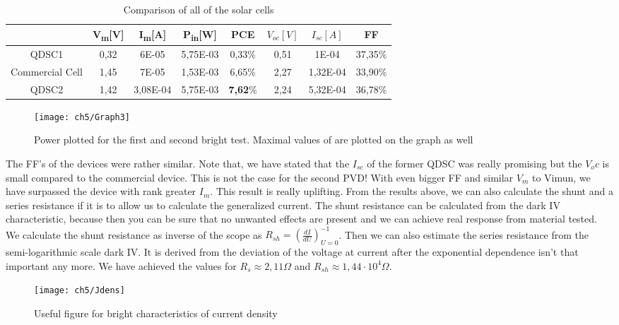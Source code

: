 \begin{table}[b]
\centering
\begin{tabular}{|c |c |c | c | c| c | c | c |}
\hline
& V\textsubscript{m}{[}V{]} & I\textsubscript{m}{[}A{]} &P\textsubscript{in}{[}W{]} & PCE & $V_{oc}[V]$ & $I_{sc}[A]$ & FF\\
\hline
QDSC1 & 0,32 & 6E-05 & 5,75E-03 & 0,33$\%$ & 0,51&1E-04&37,35$\%$\\
\hline
Commercial Cell & 1,45 & 7E-05 & 1,53E-03 & 6,65$\%$ & 2,27 & 1,32E-04 &33,90$\%$\\
\hline
QDSC2 & 1,42 & 3,08E-04 & 5,75E-03 & \textbf{7,62$\%$} & 2,24 & 5,32E-04 &36,78$\%$\\
\hline

\end{tabular}
\caption{Comparison of all of the solar cells}
\end{table}

\begin{figure}[H]
\centering
\texttt{[image: ch5/Graph3]}
\caption{Power plotted for the first and second bright test. Maximal values of are plotted on the graph as well}
\label{fig:power}
\end{figure}

The FF's of the devices were rather similar. Note that, we have stated that the $I_{sc}$ of the former QDSC was really promising but the $V_oc$ is small compared to the commercial device. This is not the case for the second PVD! With even bigger FF and similar $V_{m}$ to Vimun, we have surpassed the device with rank greater $I_m$. This result is really uplifting. From the results above, we can also calculate the shunt and a series resistance if it is to allow us to calculate the generalized current. The shunt resistance can be calculated from the dark IV characteristic, because then you can be sure that no unwanted effects are present and we can achieve real response from material tested. We calculate the shunt resistance as inverse of the scope as $R_{sh}=\left( \frac{dI}{dU}\right) ^{-1}_{U=0}$. Then we can also estimate the series resistance from the semi-logarithmic scale dark IV. It is derived from the deviation of the voltage at current after the exponential dependence isn't that important any more. We have achieved the values for $R_s \approx 2,11 \Omega$ and $R_{sh} \approx 1,44\cdot 10^{4}\Omega$. \cite{Zekry1996}

\begin{figure}[ht]
\centering
\texttt{[image: ch5/Jdens]}
\caption{Useful figure for bright characteristics of current density}
\end{figure}
